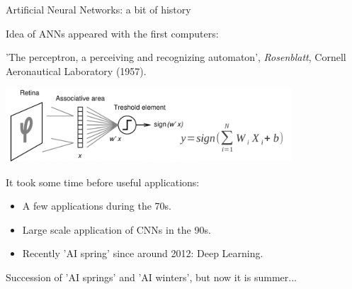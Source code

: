 \documentclass{beamer}
\begin{document}
\begin{frame}{Artificial Neural Networks: a bit of history}
    \begin{center}
    Idea of ANNs appeared with the first computers: \\
    \end{center}
    'The perceptron, a perceiving and recognizing automaton', \textit{Rosenblatt}, Cornell Aeronautical Laboratory (1957). \\

    \begin{center}
      \includegraphics[width=0.8\textwidth]{./Figures/ANNs_supervised_learning/perceptron}
    \end{center}

    It took some time before useful applications:

    \begin{itemize}
      \item A few applications during the 70s.
      \item Large scale application of CNNs in the 90s.
      \item Recently 'AI spring' since around 2012: Deep Learning.
    \end{itemize}

    Succession of 'AI springs' and 'AI winters', but now it is summer...
\end{frame}
\end{document}
